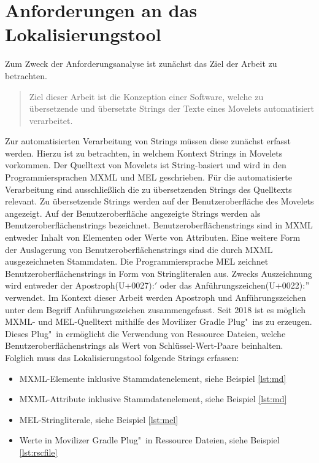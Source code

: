 \chapter{Anforderungen an das Lokalisierungstool}
\label{chp:anforderungen}
Zum Zweck der Anforderungsanalyse ist zunächst das Ziel der Arbeit zu betrachten.
\begin{quote}
	Ziel dieser Arbeit ist die Konzeption einer Software, welche zu übersetzende und übersetzte Strings der Texte eines Movelets automatisiert verarbeitet.
\end{quote}
Zur automatisierten Verarbeitung von Strings müssen diese zunächst erfasst werden. Hierzu ist zu betrachten, in welchem Kontext Strings in Movelets vorkommen. Der Quelltext von Movelets ist String-basiert und wird in den Programmiersprachen \ac{MXML} und \ac{MEL} geschrieben. Für die automatisierte Verarbeitung sind ausschließlich die zu übersetzenden Strings des Quelltexts relevant. Zu übersetzende Strings werden auf der Benutzeroberfläche des Movelets angezeigt. Auf der Benutzeroberfläche angezeigte Strings werden als Benutzeroberflächenstrings bezeichnet. Benutzeroberflächenstrings sind in \ac{MXML} entweder Inhalt von Elementen oder Werte von Attributen.
\autocite[Vgl.][]{Nitschkowski.2016}
Eine weitere Form der Auslagerung von Benutzeroberflächenstrings sind die durch \ac{MXML} ausgezeichneten Stammdaten.
\autocite[Vgl.][]{Nitschkowski.2016b}
Die Programmiersprache \ac{MEL} zeichnet Benutzeroberflächenstrings in Form von Stringliteralen aus. Zwecks Auszeichnung wird entweder der Apostroph(U+0027):$'$ oder das Anführungszeichen(U+0022):$"$ verwendet. Im Kontext dieser Arbeit werden Apostroph und Anführungszeichen unter dem Begriff Anführungszeichen zusammengefasst.
\autocite[Vgl.][]{Nitschkowski.2018}
Seit 2018 ist es möglich \ac{MXML}- und \ac{MEL}-Quelltext mithilfe des Movilizer Gradle Plug"~ins zu erzeugen. Dieses Plug"~in ermöglicht die Verwendung von Ressource Dateien, welche Benutzeroberflächenstrings als Wert von Schlüssel-Wert-Paare beinhalten.
\autocite[Vgl.][]{Mula.2018}
Folglich muss das Lokalisierungstool folgende Strings erfassen:
\begin{itemize}
	\item \ac{MXML}-Elemente inklusive Stammdatenelement, siehe Beispiel \ref{lst:md}
	\item \ac{MXML}-Attribute inklusive Stammdatenelement, siehe Beispiel \ref{lst:md}
	\item \ac{MEL}-Stringliterale, siehe Beispiel \ref{lst:mel}
	\item Werte in Movilizer Gradle Plug"~in Ressource Dateien, siehe Beispiel \ref{lst:rscfile}
\end{itemize} 
